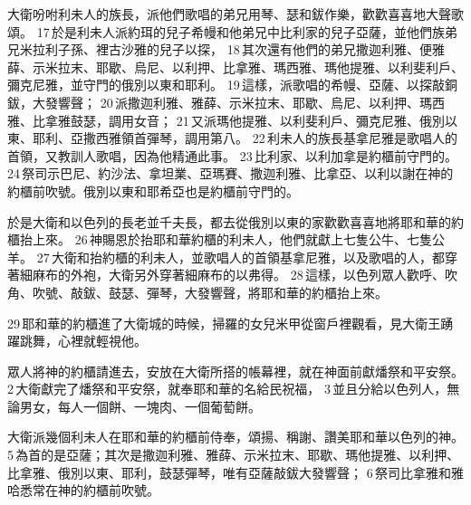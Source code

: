 大衛吩咐利未人的族長，派他們歌唱的弟兄用琴、瑟和鈸作樂，歡歡喜喜地大聲歌頌。 17 於是利未人派約珥的兒子希幔和他弟兄中比利家的兒子亞薩，並他們族弟兄米拉利子孫、裡古沙雅的兒子以探， 18 其次還有他們的弟兄撒迦利雅、便雅薛、示米拉末、耶歇、烏尼、以利押、比拿雅、瑪西雅、瑪他提雅、以利斐利戶、彌克尼雅，並守門的俄別以東和耶利。 19 這樣，派歌唱的希幔、亞薩、以探敲銅鈸，大發響聲； 20 派撒迦利雅、雅薛、示米拉末、耶歇、烏尼、以利押、瑪西雅、比拿雅鼓瑟，調用女音； 21 又派瑪他提雅、以利斐利戶、彌克尼雅、俄別以東、耶利、亞撒西雅領首彈琴，調用第八。 22 利未人的族長基拿尼雅是歌唱人的首領，又教訓人歌唱，因為他精通此事。 23 比利家、以利加拿是約櫃前守門的。 24 祭司示巴尼、約沙法、拿坦業、亞瑪賽、撒迦利雅、比拿亞、以利以謝在神的約櫃前吹號。俄別以東和耶希亞也是約櫃前守門的。

於是大衛和以色列的長老並千夫長，都去從俄別以東的家歡歡喜喜地將耶和華的約櫃抬上來。 26 神賜恩於抬耶和華約櫃的利未人，他們就獻上七隻公牛、七隻公羊。 27 大衛和抬約櫃的利未人，並歌唱人的首領基拿尼雅，以及歌唱的人，都穿著細麻布的外袍，大衛另外穿著細麻布的以弗得。 28 這樣，以色列眾人歡呼、吹角、吹號、敲鈸、鼓瑟、彈琴，大發響聲，將耶和華的約櫃抬上來。

29 耶和華的約櫃進了大衛城的時候，掃羅的女兒米甲從窗戶裡觀看，見大衛王踴躍跳舞，心裡就輕視他。

眾人將神的約櫃請進去，安放在大衛所搭的帳幕裡，就在神面前獻燔祭和平安祭。 2 大衛獻完了燔祭和平安祭，就奉耶和華的名給民祝福， 3 並且分給以色列人，無論男女，每人一個餅、一塊肉、一個葡萄餅。

大衛派幾個利未人在耶和華的約櫃前侍奉，頌揚、稱謝、讚美耶和華以色列的神。 5 為首的是亞薩；其次是撒迦利雅、雅薛、示米拉末、耶歇、瑪他提雅、以利押、比拿雅、俄別以東、耶利，鼓瑟彈琴，唯有亞薩敲鈸大發響聲； 6 祭司比拿雅和雅哈悉常在神的約櫃前吹號。

